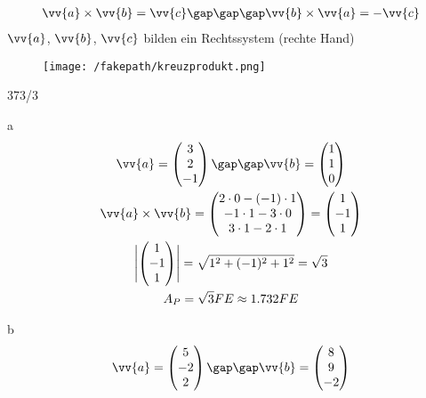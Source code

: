 \newpage
\begin{gather*}
  \vv{a} \times \vv{b} = \vv{c} \gap\gap\gap \vv{b} \times \vv{a} = -\vv{c}
\end{gather*}
$\vv{a}$, $\vv{b}$, $\vv{c}$ bilden ein Rechtssystem (rechte Hand)
\begin{figure}[H]
  \centering
  \texttt{[image: /fakepath/kreuzprodukt.png]}
\end{figure}
\begin{exercise}{373/3}
  \item [a]
  \begin{gather*}
    \vv{a} = \begin{pmatrix}3 \\ 2 \\ -1\end{pmatrix} \gap\gap \vv{b} = \begin{pmatrix}1 \\ 1 \\ 0\end{pmatrix} \\
    \vv{a} \times \vv{b} = \begin{pmatrix}2 \cdot 0 - (-1) \cdot 1 \\ -1 \cdot 1 - 3 \cdot 0 \\ 3 \cdot 1 - 2 \cdot 1\end{pmatrix} = \begin{pmatrix}1 \\ -1 \\ 1\end{pmatrix} \\
    \Biggl|\begin{pmatrix}1 \\ -1 \\ 1\end{pmatrix}\Biggr| = \sqrt{1^2 + (-1)^2 + 1^2} = \sqrt{3} \\
    A_P = \sqrt{3}FE \approx 1.732FE
  \end{gather*}
  \item [b]
  \begin{gather*}
    \vv{a} = \begin{pmatrix}5 \\ -2 \\ 2\end{pmatrix} \gap\gap \vv{b} = \begin{pmatrix}8 \\ 9 \\ -2\end{pmatrix} \\

\end{gather*}
\end{exercise}

